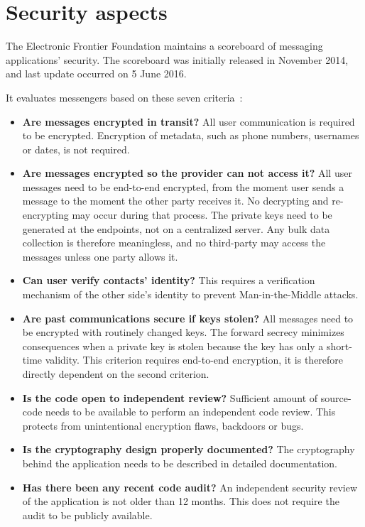 \documentclass[thesis=M,english]{FITthesis}[2012/10/20]
\begin{document}
\section{Security aspects}

The Electronic Frontier Foundation maintains a scoreboard of messaging applications' security. The scoreboard was initially released in November 2014, and last update occurred on 5 June 2016.

It evaluates messengers based on these seven criteria~\cite{eff-score}:

\begin{itemize}
	\item \textbf{Are messages encrypted in transit?} All user communication is required to be encrypted. Encryption of metadata, such as phone numbers, usernames or dates, is not required. %
	\item \textbf{Are messages encrypted so the provider can not access it?} All user messages need to be end-to-end encrypted, from the moment user sends a message to the moment the other party receives it. No decrypting  and re-encrypting may occur during that process. The private keys need to be generated at the endpoints, not on a centralized server. Any bulk data collection is therefore meaningless, and no third-party may access the messages unless one party allows it.
	\item \textbf{Can user verify contacts' identity?} This requires a verification mechanism of the other side's identity to prevent Man-in-the-Middle attacks. 
	\item \textbf{Are past communications secure if keys stolen?} All messages need to be encrypted with routinely changed keys. The forward secrecy minimizes consequences when a private key is stolen because the key has only a short-time validity. This criterion requires end-to-end encryption, it is therefore directly dependent on the second criterion.
	\item \textbf{Is the code open to independent review?} Sufficient amount of source-code needs to be available to perform an independent code review. This protects from unintentional encryption flaws, backdoors or bugs.
	\item \textbf{Is the cryptography design properly documented?} The cryptography behind the application needs to be described in detailed documentation.
	\item \textbf{Has there been any recent code audit?} An independent security review of the application is not older than 12 months. This does not require the audit to be publicly available.
\end{itemize}
\end{document}
